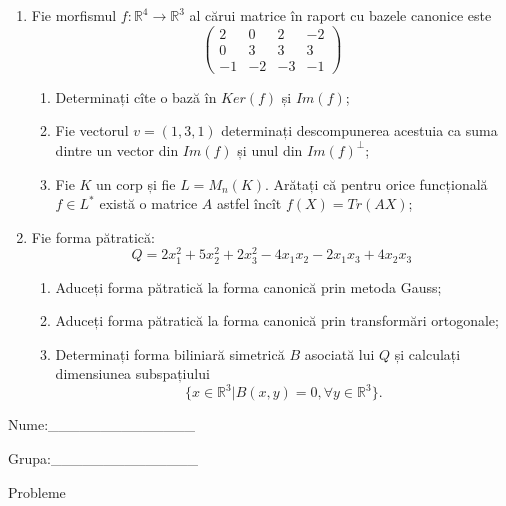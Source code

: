 \documentclass{article}
\begin{document}
\begin{enumerate}
 \item Fie morfismul $f:\mathbb{R}^4 \to \mathbb{R}^3$ al cărui matrice în raport cu bazele canonice este
$$\begin{pmatrix}
2&0&2&-2\\
0&3&3&3\\
-1&-2&-3&-1
\end{pmatrix}$$

\begin{enumerate}
\item Determinați cîte o bază în $Ker(f)$ și $Im(f)$;
\item Fie vectorul $v=(1,3,1)$ determinați descompunerea acestuia ca suma dintre un vector din $Im(f)$ și unul din $Im(f)^\perp$;
\item Fie $K$ un corp și fie $L=M_n(K)$. Arătați că pentru orice funcțională $f \in L^*$ există o matrice $A$ astfel încît $f(X)=Tr(AX)$;
\end{enumerate}
\item Fie forma pătratică:
$$Q= 2x_1^2+5x_2^2+2x_3^2-4x_1x_2-2x_1x_3+4x_2x_3$$

\begin{enumerate}
\item Aduceți forma pătratică la forma canonică prin metoda Gauss;
\item Aduceți forma pătratică la forma canonică prin transformări ortogonale;
\item Determinați forma biliniară simetrică $B$ asociată lui $Q$ și calculați dimensiunea subspațiului
$$\{x \in \mathbb{R}^3 | B(x,y)=0,\forall y \in \mathbb{R}^3\}.$$

\end{enumerate}
\end{enumerate}
\newpage
\begin{flushright}
Nume:\_\_\_\_\_\_\_\_\_\_\_\_\_\_
 
 
Grupa:\_\_\_\_\_\_\_\_\_\_\_\_\_\_
\end{flushright}
\begin{center}
\vspace{2cm}
{\Large Probleme}
\vspace{2cm}
\end{center}
\end{document}
